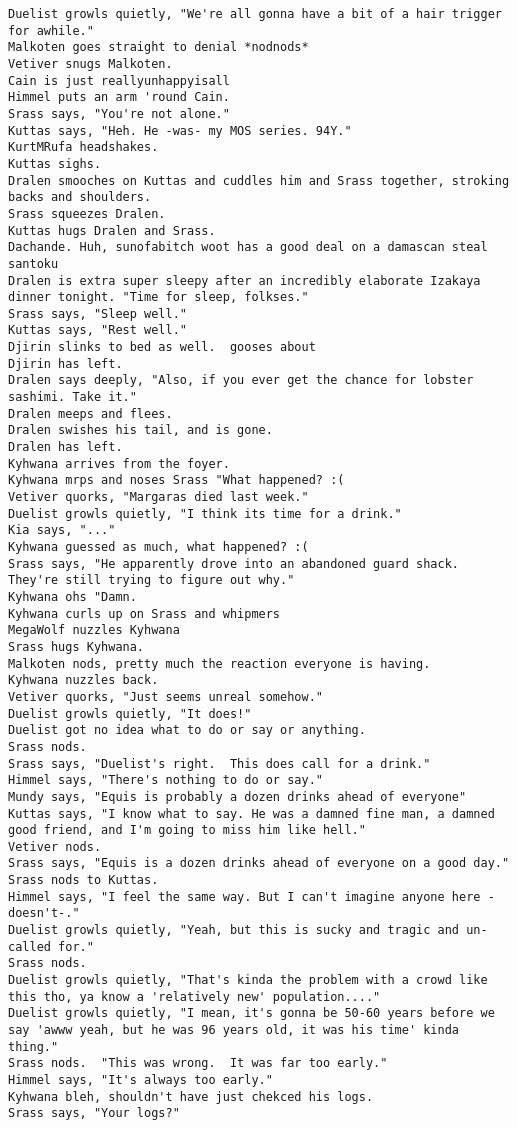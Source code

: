 \begin{verbatim}
Duelist growls quietly, "We're all gonna have a bit of a hair trigger for awhile."
Malkoten goes straight to denial *nodnods*
Vetiver snugs Malkoten.
Cain is just reallyunhappyisall
Himmel puts an arm 'round Cain.
Srass says, "You're not alone."
Kuttas says, "Heh. He -was- my MOS series. 94Y."
KurtMRufa headshakes.
Kuttas sighs.
Dralen smooches on Kuttas and cuddles him and Srass together, stroking backs and shoulders.
Srass squeezes Dralen.
Kuttas hugs Dralen and Srass.
Dachande. Huh, sunofabitch woot has a good deal on a damascan steal santoku
Dralen is extra super sleepy after an incredibly elaborate Izakaya dinner tonight. "Time for sleep, folkses."
Srass says, "Sleep well."
Kuttas says, "Rest well."
Djirin slinks to bed as well.  gooses about
Djirin has left.
Dralen says deeply, "Also, if you ever get the chance for lobster sashimi. Take it."
Dralen meeps and flees.
Dralen swishes his tail, and is gone.
Dralen has left.
Kyhwana arrives from the foyer.
Kyhwana mrps and noses Srass "What happened? :(
Vetiver quorks, "Margaras died last week."
Duelist growls quietly, "I think its time for a drink."
Kia says, "..."
Kyhwana guessed as much, what happened? :(
Srass says, "He apparently drove into an abandoned guard shack.  They're still trying to figure out why."
Kyhwana ohs "Damn.
Kyhwana curls up on Srass and whipmers
MegaWolf nuzzles Kyhwana
Srass hugs Kyhwana.
Malkoten nods, pretty much the reaction everyone is having.
Kyhwana nuzzles back.
Vetiver quorks, "Just seems unreal somehow."
Duelist growls quietly, "It does!"
Duelist got no idea what to do or say or anything.
Srass nods.
Srass says, "Duelist's right.  This does call for a drink."
Himmel says, "There's nothing to do or say."
Mundy says, "Equis is probably a dozen drinks ahead of everyone"
Kuttas says, "I know what to say. He was a damned fine man, a damned good friend, and I'm going to miss him like hell."
Vetiver nods.
Srass says, "Equis is a dozen drinks ahead of everyone on a good day."
Srass nods to Kuttas.
Himmel says, "I feel the same way. But I can't imagine anyone here -doesn't-."
Duelist growls quietly, "Yeah, but this is sucky and tragic and un-called for."
Srass nods.
Duelist growls quietly, "That's kinda the problem with a crowd like this tho, ya know a 'relatively new' population...."
Duelist growls quietly, "I mean, it's gonna be 50-60 years before we say 'awww yeah, but he was 96 years old, it was his time' kinda thing."
Srass nods.  "This was wrong.  It was far too early."
Himmel says, "It's always too early."
Kyhwana bleh, shouldn't have just chekced his logs.
Srass says, "Your logs?"

\end{verbatim}
